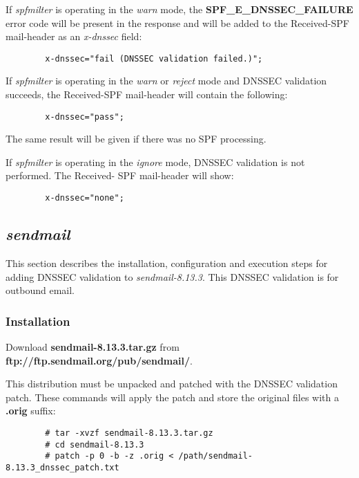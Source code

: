 \documentclass[12pt]{article}
\newcommand{\cmd}[1]{{\em #1}}
\newcommand{\const}[1]{{\bf #1}}
\newcommand{\path}[1]{{\bf #1}}
\newcommand{\url}[1]{{\bf #1}}
\begin{document}
If \cmd{spfmilter} is operating in the {\it warn} mode, the
\const{SPF\_\-E\_\-DNS\-SEC\_\-FAILURE} error code will be present in the
response and will be added to the Received-SPF mail-header as an {\it x-dnssec}
field:
\begin{verbatim}
        x-dnssec="fail (DNSSEC validation failed.)";
\end{verbatim}

If \cmd{spfmilter} is operating in the {\it warn} or {\it reject} mode and
DNSSEC validation succeeds, the Received-SPF mail-header will contain the
following:
\begin{verbatim}
        x-dnssec="pass";
\end{verbatim}

The same result will be given if there was no SPF processing.

If \cmd{spfmilter} is operating in the {\it ignore} mode, DNSSEC validation
is not performed.  The Received- SPF mail-header will show:
\begin{verbatim}
        x-dnssec="none";
\end{verbatim}


\subsection{\cmd{sendmail}}

This section describes the installation, configuration and execution steps
for adding DNSSEC validation to \cmd{sendmail-8.13.3}.  This DNSSEC
validation is for outbound email.


\subsubsection{Installation}

Download \path{sendmail-8.13.3.tar.gz} from
\url{ftp://ftp.sendmail.org/pub/sendmail/}.

This distribution must be unpacked and patched with the DNSSEC validation
patch.  These commands will apply the patch and store the original files with
a \path{.orig} suffix:

\begin{verbatim}
        # tar -xvzf sendmail-8.13.3.tar.gz
        # cd sendmail-8.13.3
        # patch -p 0 -b -z .orig < /path/sendmail-8.13.3_dnssec_patch.txt
\end{verbatim}
\end{document}

